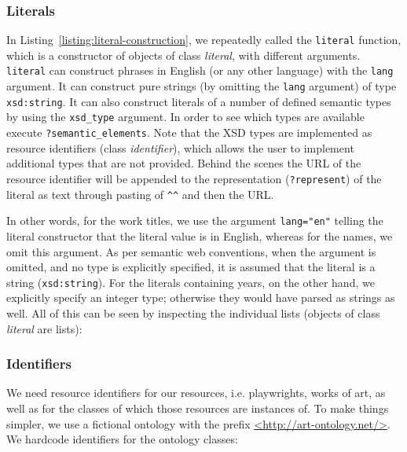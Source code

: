 \subsubsection{Literals}

In Listing~\ref{listing:literal-construction}, we repeatedly called the {\tt literal} function, which is a constructor of objects of class \emph{literal}, with different arguments. {\tt literal} can construct phrases in English (or any other language) with the {\tt lang} argument. It can construct pure strings (by omitting the {\tt lang} argument) of type {\tt xsd:string}. It can also construct literals of a number of defined semantic types by using the {\tt xsd\_type} argument. In order to see which types are available execute {\tt ?semantic\_elements}. Note that the XSD types are implemented as resource identifiers (class \emph{identifier}), which allows the user to implement additional types that are not provided. Behind the scenes the URL of the resource identifier will be appended to the representation ({\tt ?represent}) of the literal as text through pasting of {\tt \textasciicircum\textasciicircum} and then the URL.



In other words, for the work titles, we use the argument {\tt lang="en"} telling the literal constructor that the literal value is in English, whereas for the names, we omit this argument. As per semantic web conventions, when the argument is omitted, and no type is explicitly specified, it is assumed that the literal is a string ({\tt xsd:string}). For the literals containing years, on the other hand, we explicitly specify an integer type; otherwise they would have parsed as strings as well. All of this can be seen by inspecting the individual lists (objects of class \emph{literal} are lists):



\subsubsection{Identifiers}

We need resource identifiers for our resources, i.e. playwrights, works of art, as well as for the classes of which those resources are instances of. To make things simpler, we use a fictional ontology with the prefix \url{<http://art-ontology.net/>}. We hardcode identifiers for the ontology classes:

